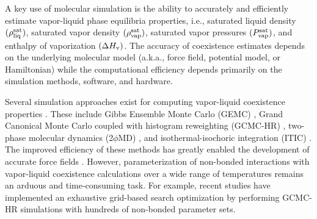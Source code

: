 \documentclass[journal=jced,manuscript=article]{achemso}
\begin{document}
A key use of molecular simulation is the ability to accurately and efficiently estimate vapor-liquid phase equilibria properties, i.e., saturated liquid density $(\rho_{\rm liq}^{\rm sat})$, saturated vapor density $(\rho_{\rm vap}^{\rm sat})$, saturated vapor pressures $(P_{\rm vap}^{\rm sat})$, and enthalpy of vaporization $(\Delta H_{\rm v})$. The accuracy of coexistence estimates depends on the underlying molecular model (a.k.a., force field, potential model, or Hamiltonian) while the computational efficiency depends primarily on the simulation methods, software, and hardware.

Several simulation approaches exist for computing vapor-liquid coexistence properties \cite{Pana2000}. These include Gibbs Ensemble Monte Carlo (GEMC) \cite{Pana2000,Stubbs2004}, Grand Canonical Monte Carlo coupled with histogram reweighting (GCMC-HR) \cite{Pana2000,Potoff1999,Stubbs2004}, two-phase molecular dynamics (2$\phi$MD) \cite{Fern2007}, and isothermal-isochoric integration (ITIC) \cite{Mostafa2018}. The improved efficiency of these methods has greatly enabled the development of accurate force fields \cite{TraPPE,TAMie,Mie,AUA4,Mess4}. However, parameterization of non-bonded interactions with vapor-liquid coexistence calculations over a wide range of temperatures remains an arduous and time-consuming task. For example, recent studies have implemented an exhaustive grid-based search optimization by performing GCMC-HR simulations with hundreds of non-bonded parameter sets. \cite{Mick_Mie,Potoff_branched,Barhaghi2017}


\end{document}
